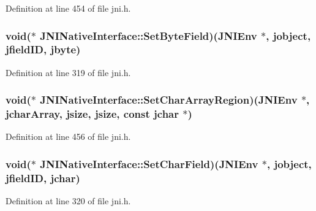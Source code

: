 Definition at line 454 of file jni.\-h.

\hypertarget{struct_j_n_i_native_interface_ab379663ee758c006b366ba8407215a5c}{
\subsubsection[{Set\-Byte\-Field}]{\setlength{\rightskip}{0pt plus 5cm}void($\ast$ J\-N\-I\-Native\-Interface\-::\-Set\-Byte\-Field)({\bf J\-N\-I\-Env} $\ast$, {\bf jobject}, {\bf jfield\-I\-D}, {\bf jbyte})}}\label{struct_j_n_i_native_interface_ab379663ee758c006b366ba8407215a5c}


Definition at line 319 of file jni.\-h.

\hypertarget{struct_j_n_i_native_interface_afd680f9986e653434f1432a94211595f}{
\subsubsection[{Set\-Char\-Array\-Region}]{\setlength{\rightskip}{0pt plus 5cm}void($\ast$ J\-N\-I\-Native\-Interface\-::\-Set\-Char\-Array\-Region)({\bf J\-N\-I\-Env} $\ast$, {\bf jchar\-Array}, {\bf jsize}, {\bf jsize}, const {\bf jchar} $\ast$)}}\label{struct_j_n_i_native_interface_afd680f9986e653434f1432a94211595f}


Definition at line 456 of file jni.\-h.

\hypertarget{struct_j_n_i_native_interface_ab2a6fe02aa87ddee97186a296fe961ba}{
\subsubsection[{Set\-Char\-Field}]{\setlength{\rightskip}{0pt plus 5cm}void($\ast$ J\-N\-I\-Native\-Interface\-::\-Set\-Char\-Field)({\bf J\-N\-I\-Env} $\ast$, {\bf jobject}, {\bf jfield\-I\-D}, {\bf jchar})}}\label{struct_j_n_i_native_interface_ab2a6fe02aa87ddee97186a296fe961ba}


Definition at line 320 of file jni.\-h.

